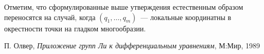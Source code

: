 \documentclass[11pt,a4paper]{article}
\theoremstyle{definition}
\numberwithin{equation}{section}
\begin{document}
Отметим, что сформулированные выше утверждения естественным образом переносятся на случай, когда $(q_1,\ldots,q_m)$~— локальные координатны в окрестности точки на гладком многообразии.



\begin{thebibliography}{3}


П. Олвер, {\em Приложение групп Ли к дифференциальным уравнениям}, М:Мир, 1989


\end{thebibliography}
\end{document}
